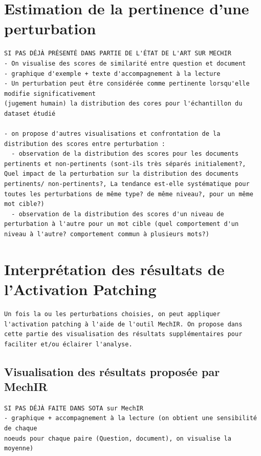 \section{Estimation de la pertinence d'une perturbation}
    \begin{verbatim}
SI PAS DÉJÀ PRÉSENTÉ DANS PARTIE DE L'ÉTAT DE L'ART SUR MECHIR
- On visualise des scores de similarité entre question et document
- graphique d'exemple + texte d'accompagnement à la lecture
- Un perturbation peut être considérée comme pertinente lorsqu'elle modifie significativement 
(jugement humain) la distribution des cores pour l'échantillon du dataset étudié

- on propose d'autres visualisations et confrontation de la distribution des scores entre perturbation :
  - observation de la distribution des scores pour les documents pertinents et non-pertinents (sont-ils très séparés initialement?, Quel impact de la perturbation sur la distribution des documents pertinents/ non-pertinents?, La tendance est-elle systématique pour toutes les perturbations de même type? de même niveau?, pour un même mot cible?)
  - observation de la distribution des scores d'un niveau de perturbation à l'autre pour un mot cible (quel comportement d'un niveau à l'autre? comportement commun à plusieurs mots?)

    \end{verbatim}

    

\section{Interprétation des résultats de l'Activation Patching}
    \begin{verbatim}
Un fois la ou les perturbations choisies, on peut appliquer l'activation patching à l'aide de l'outil MechIR. On propose dans cette partie des visualisation des résultats supplémentaires pour faciliter et/ou éclairer l'analyse.
    \end{verbatim}
    \subsection{Visualisation des résultats proposée par MechIR}
        \begin{verbatim}
SI PAS DÉJÀ FAITE DANS SOTA sur MechIR
- graphique + accompagnement à la lecture (on obtient une sensibilité de chaque 
noeuds pour chaque paire (Question, document), on visualise la moyenne)
        \end{verbatim}


